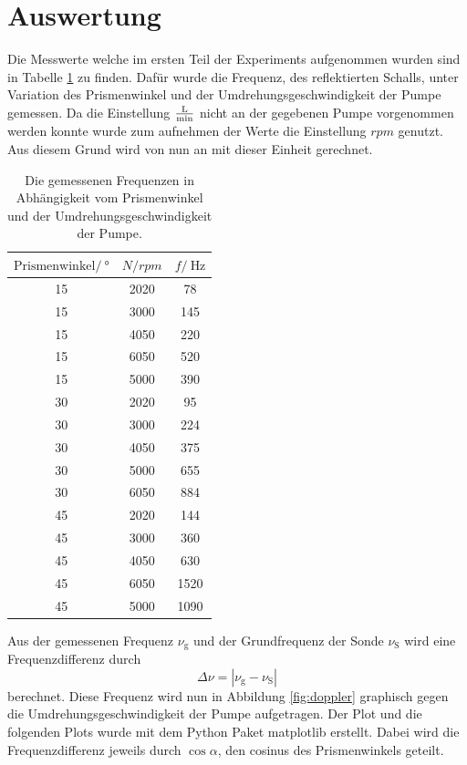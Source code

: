 \section{Auswertung}
\label{sec:Auswertung}

Die Messwerte welche im ersten Teil der Experiments aufgenommen wurden sind in Tabelle \ref{tab:doppler} zu finden.
Dafür wurde die Frequenz, des reflektierten Schalls, unter Variation des Prismenwinkel und der Umdrehungsgeschwindigkeit der Pumpe gemessen.
Da die Einstellung $\si{\frac{\litre}{\minute}}$ nicht an der gegebenen Pumpe vorgenommen werden konnte wurde zum aufnehmen der Werte die Einstellung $rpm$ genutzt.
Aus diesem Grund wird von nun an mit dieser Einheit gerechnet.

\begin{table}
    \centering
    \begin{tabular}{ccc}
    \toprule
    $\text{Prismenwinkel}/\SI{}{\degree}$ & $N/rpm$ &  $f/\SI{}{\Hz}$ \\
    \midrule
    15 & 2020 & 78      \\
    15 & 3000 & 145     \\
    15 & 4050 & 220     \\
    15 & 6050 & 520     \\
    15 & 5000 & 390     \\
    30 & 2020 & 95      \\
    30 & 3000 & 224     \\
    30 & 4050 & 375     \\
    30 & 5000 & 655     \\
    30 & 6050 & 884     \\
    45 & 2020 & 144     \\
    45 & 3000 & 360     \\
    45 & 4050 & 630     \\
    45 & 6050 & 1520    \\
    45 & 5000 & 1090    \\
    \bottomrule
    \end{tabular}
    \caption{Die gemessenen Frequenzen in Abhängigkeit vom Prismenwinkel und der Umdrehungsgeschwindigkeit der Pumpe.}
    \label{tab:doppler}
\end{table}

Aus der gemessenen Frequenz $\nu_\text{g}$ und der Grundfrequenz der Sonde $\nu_\text{S}$ wird eine Frequenzdifferenz durch
\begin{equation*}
    \Delta \nu = \left| \nu_\text{g}-\nu_\text{S} \right|
\end{equation*}
berechnet. Diese Frequenz wird nun in Abbildung \ref{fig:doppler} graphisch gegen die Umdrehungsgeschwindigkeit der Pumpe aufgetragen.
Der Plot und die folgenden Plots wurde mit dem Python Paket matplotlib \cite{matplotlib} erstellt.
Dabei wird die Frequenzdifferenz jeweils durch $\cos{\alpha}$, den cosinus des Prismenwinkels geteilt.

